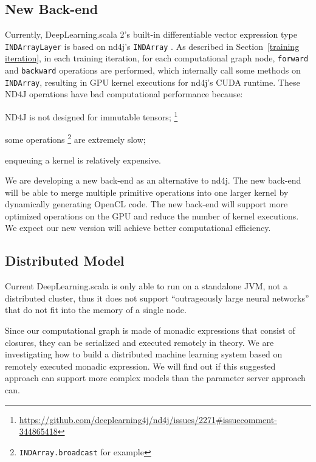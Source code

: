 \subsection{New Back-end}\label{New Back-end}
Currently, DeepLearning.scala 2's built-in differentiable vector expression type \lstinline{INDArrayLayer} is based on nd4j's \lstinline{INDArray} \cite{skymind2017nd4j}.
As described in Section~\ref{training iteration}, in each training iteration, for each \gls{computational graph} node, \lstinline{forward} and \lstinline{backward} operations are performed, which internally call some methods on \lstinline{INDArray}, resulting in GPU kernel executions for nd4j's CUDA runtime. These ND4J operations have bad computational performance because:
\begin{enumerate*}
  \item ND4J is not designed for immutable tensors; \footnote{\url{https://github.com/deeplearning4j/nd4j/issues/2271\#issuecomment-344865418}}
  \item some operations \footnote{\lstinline{INDArray.broadcast} for example} are extremely slow;
  \item enqueuing a kernel is relatively expensive.
\end{enumerate*}

 We are developing a new back-end as an alternative to nd4j. The new back-end will be able to merge multiple primitive operations into one larger kernel by dynamically generating OpenCL code. The new back-end
 will support more optimized operations on the GPU and reduce the number of kernel executions. We expect our new version will achieve better computational efficiency.

\subsection{Distributed Model}

Current DeepLearning.scala is only able to run on a standalone JVM, not a distributed cluster, thus it does not support ``outrageously large neural networks'' \cite{shazeer2017outrageously} that do not fit into the memory of a single node.

Since our \gls{computational graph} is made of monadic expressions that consist of closures, they can be serialized and executed remotely in theory. We are investigating how to build a distributed machine learning system based on remotely executed monadic expression. We will find out if this suggested approach can support more complex models than the parameter server approach can.




